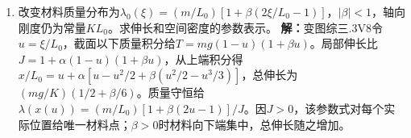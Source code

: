 \documentclass[UTF8,fontset=fandol,a4paper,11pt]{ctexart}
\begin{document}
\begin{enumerate}
\item 改变材料质量分布为$\lambda_0(\xi)=(m/L_0)[1+\beta(2\xi/L_0-1)]$，$|\beta|<1$，轴向刚度仍为常量$KL_0$。求伸长和空间密度的参数表示。
\textbf{解：}变图综三.3V8令$u=\xi/L_0$，截面以下质量积分给$T=mg(1-u)(1+\beta u)$。局部伸长比$J=1+\alpha(1-u)(1+\beta u)$，从上端积分得$x/L_0=u+\alpha[u-u^2/2+\beta(u^2/2-u^3/3)]$，总伸长为$(mg/K)(1/2+\beta/6)$。质量守恒给$\lambda(x(u))=(m/L_0)[1+\beta(2u-1)]/J$。因$J>0$，该参数式对每个实际位置给唯一材料点；$\beta>0$时材料向下端集中，总伸长随之增加。
\begin{center}\begin{minipage}{.98\linewidth}\centering
{}
\end{minipage}
\end{center}
\end{enumerate}
\end{document}
